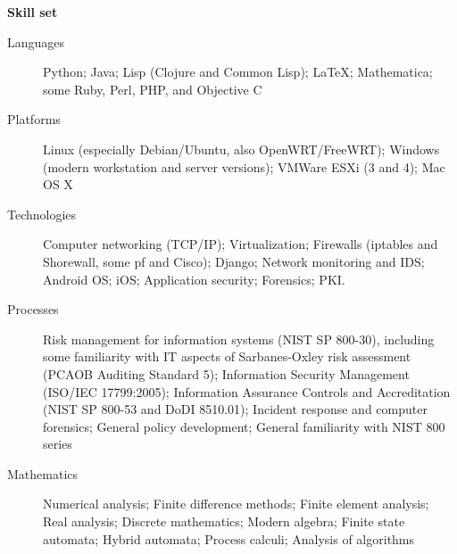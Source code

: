 \documentclass[letterpaper,11pt]{article}
\newcommand{\resheading}[1]{{\large \colorbox{mygrey}{\begin{minipage}
    {\textwidth}{\textbf{#1 \vphantom{p\^{E}}}}\end{minipage}}}}
\begin{document}
\resheading{Skill set}
\begin{description}
\item[Languages]
Python; Java; Lisp (Clojure and Common Lisp); \LaTeX; Mathematica; some Ruby, Perl, PHP, and Objective C
\item[Platforms]
Linux (especially Debian/Ubuntu, also OpenWRT/FreeWRT);
Windows (modern workstation and server versions);
VMWare ESXi (3 and 4); Mac OS X
\item[Technologies]
Computer networking (TCP/IP); Virtualization; Firewalls (iptables and Shorewall,
some pf and Cisco); Django; Network monitoring and IDS; Android OS; iOS; Application
security; Forensics; PKI.
\item[Processes]
Risk management for information systems (NIST SP 800-30),
including some familiarity with IT aspects of Sarbanes-Oxley risk assessment
(PCAOB Auditing Standard 5); Information Security Management (ISO/IEC 17799:2005);
Information Assurance Controls and Accreditation (NIST SP 800-53 and DoDI 8510.01);
Incident response and computer forensics; General policy development;
General familiarity with NIST 800 series
\item[Mathematics]
Numerical analysis; Finite difference methods; Finite element analysis;
Real analysis; Discrete mathematics; Modern algebra; Finite state automata;
Hybrid automata; Process calculi; Analysis of algorithms
\end{description}

%
\end{document}
